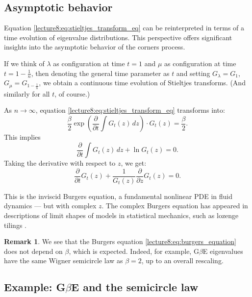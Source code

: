 \documentclass[letterpaper,11pt,oneside,reqno]{book}
\numberwithin{equation}{chapter}  %
\theoremstyle{definition}
\newtheorem{remark}[proposition]{Remark}
\begin{document}
\subsection{Asymptotic behavior}

Equation \eqref{lecture8:eq:stieltjes_transform_eq} can be reinterpreted in terms of a time evolution of eigenvalue distributions. This perspective offers significant insights into the asymptotic behavior of the corners process.

If we think of $\lambda$ as configuration at time $t=1$ and $\mu$ as configuration at time $t=1-\frac{1}{n}$, then denoting the general time parameter as $t$ and setting $G_\lambda = G_1$, $G_\mu = G_{1-\frac{1}{n}}$, we obtain a continuous time evolution of Stieltjes transforms.
(And similarly for all $t$, of course.)

As $n \to \infty$, equation \eqref{lecture8:eq:stieltjes_transform_eq} transforms into:
\begin{equation*}
\frac{\beta}{2} \exp\left(\frac{\partial}{\partial t}\int G_t(z)\,dz\right) \cdot G_t(z) = \frac{\beta}{2}.
\end{equation*}
This implies
\begin{equation*}
\frac{\partial}{\partial t}\int G_t(z)\,dz + \ln G_t(z) = 0.
\end{equation*}
Taking the derivative with respect to $z$, we get:
\begin{equation}
\label{lecture8:eq:burgers_equation}
\frac{\partial}{\partial t}G_t(z) + \frac{1}{G_t(z)}\frac{\partial}{\partial z}G_t(z) = 0.
\end{equation}

This is the inviscid Burgers equation, a
fundamental nonlinear PDE in fluid dynamics --- but with complex $z$.
The complex Burgers equation has appeared in descriptions of
limit shapes of models in statistical mechanics, such as lozenge tilings
\cite{OkounkovKenyon2007Limit}.

\begin{remark}
	We see that the Burgers equation \eqref{lecture8:eq:burgers_equation} does not depend on $\beta$,
	which is expected. Indeed, for example, G$\beta$E eigenvalues
	have the same Wigner semicircle law as $\beta=2$, up to an overall
	rescaling.
\end{remark}

\subsection{Example: G$\beta$E and the semicircle law}
\end{document}
